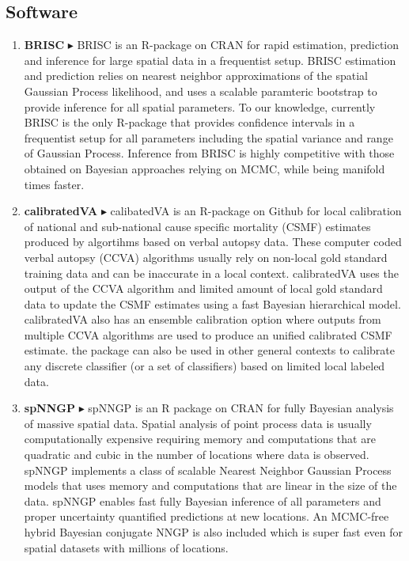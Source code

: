 \documentclass[10pt]{article}
\newcommand{\myben}[1]{\smallskip\begin{enumerate}[start=1,label={\scriptsize \arabic*$\ $},leftmargin=\parindent]\setlength{\itemsep}{#1}\vspace*{-0.7em}}
\newcommand{\ee}{\end{enumerate}}
\begin{document}
\subsection*{Software}

\myben{0.4em}

\item
{\bf BRISC} $\blacktriangleright$
BRISC is an R-package on CRAN for rapid estimation, prediction and inference for large spatial data in a frequentist setup. BRISC estimation and prediction relies on nearest neighbor approximations of the spatial Gaussian Process likelihood, and uses a scalable paramteric bootstrap to provide inference for all spatial parameters. To our knowledge, currently BRISC is the only R-package that provides confidence intervals in a frequentist setup for all parameters including the spatial variance and range of Gaussian Process. Inference from BRISC is highly competitive with those obtained on Bayesian approaches relying on MCMC, while being manifold times faster.
\item
{\bf calibratedVA} $\blacktriangleright$
calibatedVA is an R-package on Github for local calibration of national and sub-national cause specific mortality (CSMF) estimates produced by algortihms based on verbal autopsy data. These computer coded verbal autopsy (CCVA) algorithms usually rely on non-local gold standard training data and can be inaccurate in a local context. calibratedVA uses the output of the CCVA algorithm and limited amount of local gold standard data to update the CSMF estimates using a fast Bayesian hierarchical model. calibratedVA also has an ensemble calibration option where outputs from multiple CCVA algorithms are used to produce an unified calibrated CSMF estimate. the package can also be used in other general contexts to calibrate any discrete classifier (or a set of classifiers) based on limited local labeled data.
\item 
{\bf spNNGP} $\blacktriangleright$
spNNGP is an R package on CRAN for fully Bayesian analysis of massive spatial data. Spatial analysis of point process data is usually computationally expensive requiring memory and computations that are quadratic and cubic in the number of locations where data is observed. spNNGP implements a class of scalable Nearest Neighbor Gaussian Process models that uses memory and computations that are linear in the size of the data. spNNGP enables fast fully Bayesian inference of all parameters and proper uncertainty quantified predictions at new locations. An MCMC-free hybrid Bayesian conjugate NNGP is also included which is super fast even for spatial datasets with millions of locations.
\ee
\end{document}
